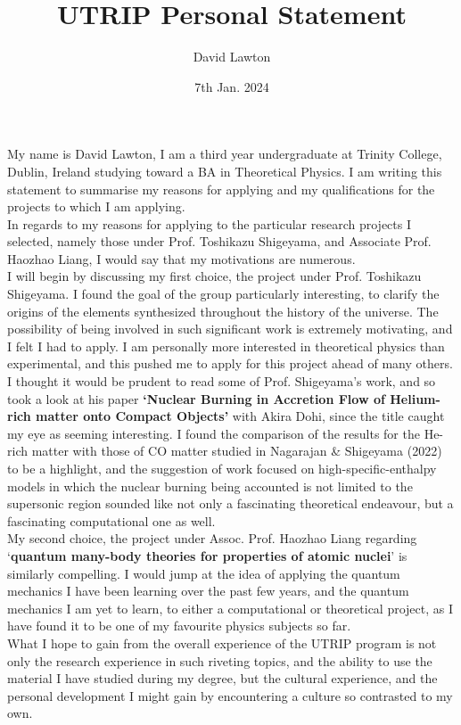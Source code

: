 \documentclass{article}
\title{UTRIP Personal Statement}
\author{David Lawton}
\date{7th Jan. 2024}
\theoremstyle{definition}
\theoremstyle{remark}
\begin{document}
\maketitle
My name is David Lawton, I am a third year undergraduate at Trinity College, Dublin, Ireland studying toward a BA in Theoretical Physics. I am writing this statement to summarise my reasons for applying and my qualifications for the projects to which I am applying.\\
\indent In regards to my reasons for applying to the particular research projects I selected, namely those under Prof. Toshikazu Shigeyama, and Associate Prof. Haozhao Liang, I would say that my motivations are numerous.\\
\indent I will begin by discussing my first choice, the project under Prof. Toshikazu Shigeyama. I found the goal of the group particularly interesting, to clarify the origins of the elements synthesized throughout the history of the universe. The possibility of being involved in such significant work is extremely motivating, and I felt I had to apply. I am personally more interested in theoretical physics than experimental, and this pushed me to apply for this project ahead of many others. I thought it would be prudent to read some of Prof. Shigeyama's work, and so took a look at his paper \textbf{`Nuclear Burning in Accretion Flow of Helium-rich matter onto Compact Objects'} with Akira Dohi, since the title caught my eye as seeming interesting. I found the comparison of the results for the He-rich matter with those of CO matter studied in Nagarajan \& Shigeyama (2022) to be a highlight, and the suggestion of work focused on high-specific-enthalpy models in which the nuclear burning being accounted is not limited to the supersonic region sounded like not only a fascinating theoretical endeavour, but a fascinating computational one as well.\\
\indent My second choice, the project under Assoc. Prof. Haozhao Liang regarding `\textbf{quantum many-body theories for properties of atomic nuclei}' is similarly compelling. I would jump at the idea of applying the quantum mechanics I have been learning over the past few years, and the quantum mechanics I am yet to learn, to either a computational or theoretical project, as I have found it to be one of my favourite physics subjects so far.\\
\indent What I hope to gain from the overall experience of the UTRIP program is not only the research experience in such riveting topics, and the ability to use the material I have studied during my degree, but the cultural experience, and the personal development I might gain by encountering a culture so contrasted to my own.\\
\end{document}
